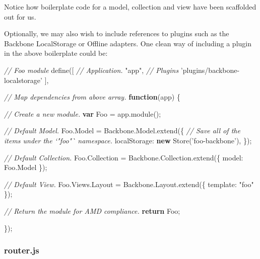 \documentclass[9pt]{book}
\newenvironment{Shaded}{}{}
\newcommand{\KeywordTok}[1]{\textcolor[rgb]{0.00,0.44,0.13}{\textbf{{#1}}}}
\newcommand{\DataTypeTok}[1]{\textcolor[rgb]{0.56,0.13,0.00}{{#1}}}
\newcommand{\StringTok}[1]{\textcolor[rgb]{0.25,0.44,0.63}{{#1}}}
\newcommand{\CommentTok}[1]{\textcolor[rgb]{0.38,0.63,0.69}{\textit{{#1}}}}
\newcommand{\OtherTok}[1]{\textcolor[rgb]{0.00,0.44,0.13}{{#1}}}
\newcommand{\FunctionTok}[1]{\textcolor[rgb]{0.02,0.16,0.49}{{#1}}}
\newcommand{\NormalTok}[1]{{#1}}
\begin{document}
Notice how boilerplate code for a model, collection and view have been
scaffolded out for us.

Optionally, we may also wish to include references to plugins such as
the Backbone LocalStorage or Offline adapters. One clean way of
including a plugin in the above boilerplate could be:

\begin{Shaded}
\begin{Highlighting}[]
\CommentTok{// Foo module}
\FunctionTok{define}\NormalTok{([}
  \CommentTok{// Application.}
  \StringTok{"app"}\NormalTok{,}
  \CommentTok{// Plugins}
  \StringTok{'plugins/backbone-localstorage'}
\NormalTok{],}

\CommentTok{// Map dependencies from above array.}
\KeywordTok{function}\NormalTok{(app) \{}

  \CommentTok{// Create a new module.}
  \KeywordTok{var} \NormalTok{Foo = }\OtherTok{app}\NormalTok{.}\FunctionTok{module}\NormalTok{();}

  \CommentTok{// Default Model.}
  \OtherTok{Foo}\NormalTok{.}\FunctionTok{Model} \NormalTok{= }\OtherTok{Backbone}\NormalTok{.}\OtherTok{Model}\NormalTok{.}\FunctionTok{extend}\NormalTok{(\{}
    \CommentTok{// Save all of the items under the `"foo"` namespace.}
    \DataTypeTok{localStorage}\NormalTok{: }\KeywordTok{new} \FunctionTok{Store}\NormalTok{(}\StringTok{'foo-backbone'}\NormalTok{),}
  \NormalTok{\});}

  \CommentTok{// Default Collection.}
  \OtherTok{Foo}\NormalTok{.}\FunctionTok{Collection} \NormalTok{= }\OtherTok{Backbone}\NormalTok{.}\OtherTok{Collection}\NormalTok{.}\FunctionTok{extend}\NormalTok{(\{}
    \DataTypeTok{model}\NormalTok{: }\OtherTok{Foo}\NormalTok{.}\FunctionTok{Model}
  \NormalTok{\});}

  \CommentTok{// Default View.}
  \OtherTok{Foo}\NormalTok{.}\OtherTok{Views}\NormalTok{.}\FunctionTok{Layout} \NormalTok{= }\OtherTok{Backbone}\NormalTok{.}\OtherTok{Layout}\NormalTok{.}\FunctionTok{extend}\NormalTok{(\{}
    \DataTypeTok{template}\NormalTok{: }\StringTok{"foo"}
  \NormalTok{\});}

  \CommentTok{// Return the module for AMD compliance.}
  \KeywordTok{return} \NormalTok{Foo;}

\NormalTok{\});}
\end{Highlighting}
\end{Shaded}

\subsubsection{router.js}\label{router.js}
\end{document}
